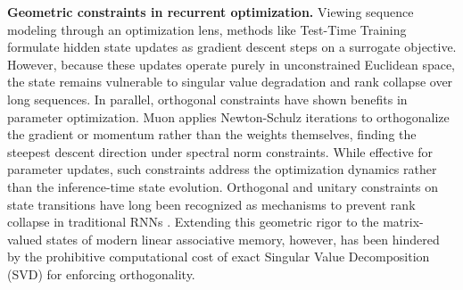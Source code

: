\noindent
\textbf{Geometric constraints in recurrent optimization.}
Viewing sequence modeling through an optimization lens, methods like Test-Time Training \cite{ICML20_ttt,ICML25_ttt,arxiv25_ttregression} formulate hidden state updates as gradient descent steps on a surrogate objective.
However, because these updates operate purely in unconstrained Euclidean space, the state remains vulnerable to singular value degradation and rank collapse over long sequences.
In parallel, orthogonal constraints have shown benefits in parameter optimization.
Muon \cite{post24_muon,arxiv25_kimimuon,ICLR26_ttt_LaCT} applies Newton-Schulz iterations \cite{SIAM06_Schur,SIAM06_Newton} to orthogonalize the gradient or momentum rather than the weights themselves, finding the steepest descent direction under spectral norm constraints.
While effective for parameter updates, such constraints address the optimization dynamics rather than the inference-time state evolution.
Orthogonal and unitary constraints on state transitions have long been recognized as mechanisms to prevent rank collapse in traditional RNNs \cite{PUR08_Absil,ICML16_urnn,NIPS16_fullurnn}.
Extending this geometric rigor to the matrix-valued states of modern linear associative memory, however, has been hindered by the prohibitive computational cost of exact Singular Value Decomposition (SVD) for enforcing orthogonality.